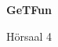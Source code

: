 \documentclass[a4paper]{article}
\begin{document}
\printGenericVSLHeader
\begin{center}
\begin{vsltext}{2.5cm}{4cm}

   \vspace{0.5cm} 

    \textbf{GeTFun} 

    \vspace{1.5cm}

    Hörsaal 4 

\end{vsltext}

\end{center}
\end{document}
